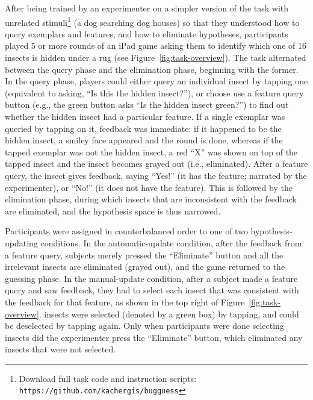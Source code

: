 \documentclass[man,floatsintext]{apa6}
\begin{document}
After being trained by an experimenter on a simpler version of the task with unrelated stimuli\footnote{Download 
full task code and instruction scripts: \texttt{https://github.com/kachergis/bugguess}} (a dog searching dog houses) so that they understood how to query exemplars and features, and how 
to eliminate hypotheses, participants played 5 or more rounds of an iPad game asking them 
to identify which one of 16 insects is hidden under a rug (see Figure~\ref{fig:task-overview}). 
The task alternated between the query phase and the elimination phase, beginning with the 
former. In the query phase, players could either query an individual insect by tapping one (equivalent 
to asking, ``Is this the hidden insect?''), or choose use a feature query button (e.g., the green button asks 
``Is the hidden insect green?'') to find out whether the hidden insect had a particular feature. If a 
single exemplar was queried by tapping on it, feedback was immediate: if it happened to be the 
hidden insect, a smiley face appeared and the round is done, whereas if the tapped exemplar 
was not the hidden insect, a red ``X'' was shown on top of the tapped insect and the insect becomes 
grayed out (i.e., eliminated). After a feature query, the insect gives feedback, saying 
``Yes!'' (it has the feature; narrated by the experimenter), or ``No!'' (it does not have 
the feature). This is followed by the elimination phase, during which insects that are 
inconsistent with the feedback are eliminated, and the hypothesis space is thus narrowed. 

Participants were assigned in counterbalanced order to one of two hypothesis-updating conditions. In the automatic-update condition, after the feedback from a 
feature query, subjects merely pressed the ``Eliminate'' button and all the irrelevant insects 
are eliminated (grayed out), and the game returned to the guessing phase. In the 
manual-update condition, after a subject made a feature query and saw feedback, 
they had to select each insect that was consistent with the feedback for that feature, as 
shown in the top right of Figure~\ref{fig:task-overview}. insects were selected (denoted by a green box) by 
tapping, and could be deselected by tapping again. Only when participants were done 
selecting insects did the experimenter press the ``Eliminate'' button, which eliminated 
any insects that were not selected. 
\end{document}
